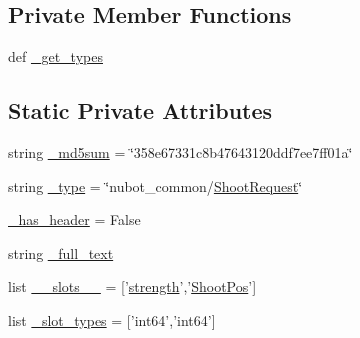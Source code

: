 \subsection*{Private Member Functions}
\begin{DoxyCompactItemize}
\item 
def \hyperlink{classnubot__common_1_1srv_1_1__Shoot_1_1ShootRequest_a50822d0a71e00c216494bdb8944b5033}{\-\_\-get\-\_\-types}
\end{DoxyCompactItemize}
\subsection*{Static Private Attributes}
\begin{DoxyCompactItemize}
\item 
string \hyperlink{classnubot__common_1_1srv_1_1__Shoot_1_1ShootRequest_a2365bd3a6ff048aecd4a3acecd1dfcd6}{\-\_\-md5sum} = \char`\"{}358e67331c8b47643120ddf7ee7ff01a\char`\"{}
\item 
string \hyperlink{classnubot__common_1_1srv_1_1__Shoot_1_1ShootRequest_ad079f4fcbe4f88ebbaebedba224c193d}{\-\_\-type} = \char`\"{}nubot\-\_\-common/\hyperlink{classnubot__common_1_1srv_1_1__Shoot_1_1ShootRequest}{Shoot\-Request}\char`\"{}
\item 
\hyperlink{classnubot__common_1_1srv_1_1__Shoot_1_1ShootRequest_a6e87023e2d40b79b654e448c3a4adc4a}{\-\_\-has\-\_\-header} = False
\item 
string \hyperlink{classnubot__common_1_1srv_1_1__Shoot_1_1ShootRequest_a5f0a9351170558a3fc0e2ce20b1dfcc8}{\-\_\-full\-\_\-text}
\item 
list \hyperlink{classnubot__common_1_1srv_1_1__Shoot_1_1ShootRequest_a15319e62b3a9cba20a974a1d56563b71}{\-\_\-\-\_\-slots\-\_\-\-\_\-} = \mbox{[}'\hyperlink{classnubot__common_1_1srv_1_1__Shoot_1_1ShootRequest_add5086aea801a8fe77b99815e1d66440}{strength}','\hyperlink{classnubot__common_1_1srv_1_1__Shoot_1_1ShootRequest_a2faff239a641d95970ca1ed02a60d935}{Shoot\-Pos}'\mbox{]}
\item 
list \hyperlink{classnubot__common_1_1srv_1_1__Shoot_1_1ShootRequest_a5bfc2503ce2d2f38b9d7ad61fab2eb8a}{\-\_\-slot\-\_\-types} = \mbox{[}'int64','int64'\mbox{]}
\end{DoxyCompactItemize}


